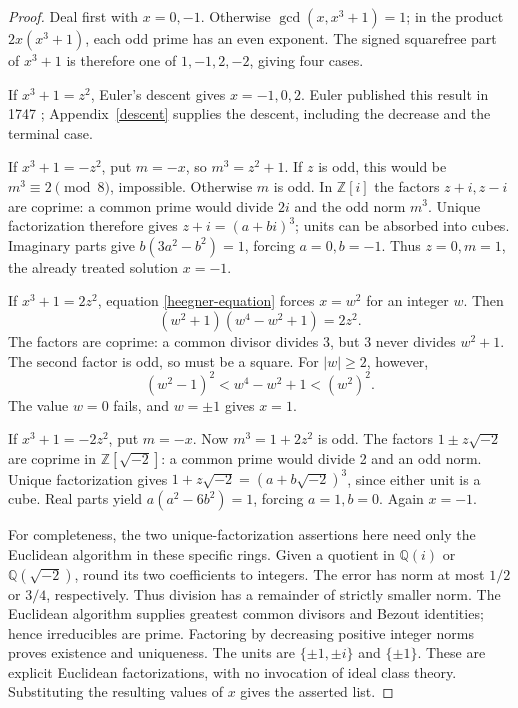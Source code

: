 \documentclass[11pt]{article}
\newcommand{\Z}{\mathbb Z}
\newcommand{\Q}{\mathbb Q}
\begin{document}
\begin{proof}
Deal first with \(x=0,-1\). Otherwise
\(\gcd(x,x^3+1)=1\); in the product \(2x(x^3+1)\), each
odd prime has an even exponent. The signed squarefree part of
\(x^3+1\) is therefore one of \(1,-1,2,-2\), giving four cases.

If \(x^3+1=z^2\), Euler's descent gives \(x=-1,0,2\).
Euler published this result in 1747 \cite[Theorem 10]{euler};
Appendix~\ref{descent} supplies the descent, including the decrease
and the terminal case.

If \(x^3+1=-z^2\), put \(m=-x\), so \(m^3=z^2+1\).
If \(z\) is odd, this would be \(m^3\equiv2\pmod8\),
impossible. Otherwise \(m\) is odd. In \(\Z[i]\) the factors
\(z+i,z-i\) are coprime: a common prime would divide \(2i\)
and the odd norm \(m^3\). Unique factorization therefore gives
\(z+i=(a+bi)^3\); units can be absorbed into cubes. Imaginary
parts give \(b(3a^2-b^2)=1\), forcing \(a=0,b=-1\).
Thus \(z=0,m=1\), the already treated solution \(x=-1\).

If \(x^3+1=2z^2\), equation \eqref{heegner-equation} forces
\(x=w^2\) for an integer \(w\). Then
\[
 (w^2+1)(w^4-w^2+1)=2z^2.
\]
The factors are coprime: a common divisor divides 3, but 3 never
divides \(w^2+1\). The second factor is odd, so must be a square.
For \(|w|\ge2\), however,
\[
 (w^2-1)^2<w^4-w^2+1<(w^2)^2.
\]
The value \(w=0\) fails, and \(w=\pm1\) gives \(x=1\).

If \(x^3+1=-2z^2\), put \(m=-x\). Now
\(m^3=1+2z^2\) is odd. The factors
\(1\pm z\sqrt{-2}\) are coprime in \(\Z[\sqrt{-2}]\):
a common prime would divide 2 and an odd norm. Unique factorization
gives \(1+z\sqrt{-2}=(a+b\sqrt{-2})^3\), since either unit
is a cube. Real parts yield
\(a(a^2-6b^2)=1\), forcing \(a=1,b=0\). Again \(x=-1\).

For completeness, the two unique-factorization assertions here need
only the Euclidean algorithm in these specific rings. Given a quotient
in \(\Q(i)\) or \(\Q(\sqrt{-2})\), round its two coefficients to
integers. The error has norm at most \(1/2\) or \(3/4\),
respectively. Thus division has a remainder of strictly smaller norm.
The Euclidean algorithm supplies greatest common divisors and Bezout
identities; hence irreducibles are prime. Factoring by decreasing
positive integer norms proves existence and uniqueness. The units are
\(\{\pm1,\pm i\}\) and \(\{\pm1\}\). These are explicit
Euclidean factorizations, with no invocation of ideal class theory.
Substituting the resulting values of \(x\) gives the asserted list.
\end{proof}
\end{document}
